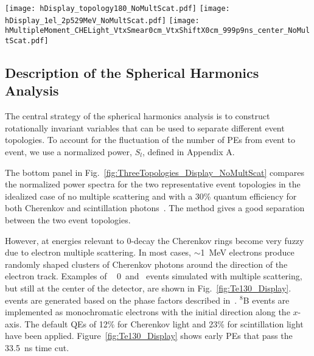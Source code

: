 \begin{figure*}[h]
  \centering
  \texttt{[image: hDisplay\_topology180\_NoMultScat.pdf]}
  \texttt{[image: hDisplay\_1el\_2p529MeV\_NoMultScat.pdf]}
  \texttt{[image: hMultipleMoment\_CHELight\_VtxSmear0cm\_VtxShiftX0cm\_999p9ns\_center\_NoMultScat.pdf]}
  \caption{\emph{Top panels:} Idealized event displays, with multiple
scattering turned off and at the center of the detector, of:
(\emph{top left}) a signal event with two 1.26~MeV back-to-back
electrons; and (\emph{top right })a \B-neutrino background event with
single 2.53~MeV electron. A 30\% QE is assumed for both Cherenkov
photons (triangles) and scintillation photons (dots).  
\emph{Bottom panel:} The normalized power spectrum $S_l$ for the
Cherenkov photons only, calculated event-by-event for the two
above topologies. The height of the rectangular boxes correspond to a 
63\% confidence level $(\pm 1 ~\sigma)$.}
  \label{fig:ThreeTopologies_Display_NoMultScat}
\end{figure*}


\subsection{Description of the Spherical Harmonics Analysis}

The central strategy of the spherical harmonics analysis is to
construct rotationally invariant variables that can be used to
separate different event topologies. To account for the fluctuation of
the number of PEs from event to event, we use a normalized power,
$S_l$, defined in Appendix A.

The bottom panel in Fig.~\ref{fig:ThreeTopologies_Display_NoMultScat}
compares the normalized power spectra for the two representative event
topologies in the idealized case of no multiple scattering and with a 30\%
quantum efficiency for both Cherenkov and scintillation
photons~\cite{QE}. The method gives a good separation between the
two event topologies.

However, at energies relevant to 0\nbb-decay the Cherenkov rings
become very fuzzy due to electron multiple scattering. In most cases,
$\sim$1~MeV electrons produce randomly shaped clusters of Cherenkov
photons around the direction of the electron track.  Examples of \Te~
0\nbb~and \B~events simulated with multiple scattering, but still at
the center of the detector, are shown in Fig.~\ref{fig:Te130_Display}.
\Te~ events are generated based on the phase factors described
in~\cite{Jenni}.  $^{8}$B events are implemented as
monochromatic electrons with the initial direction along the
$x$-axis. The default QEs of 12\% for Cherenkov light and 23\% for
scintillation light have been  applied. Figure~\ref{fig:Te130_Display} shows
early PEs that pass the 33.5~ns time cut. 

